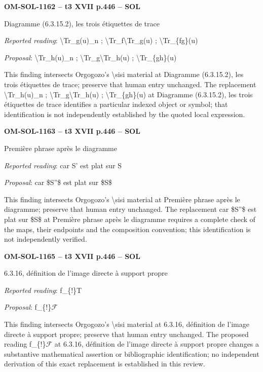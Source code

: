 \par\noindent\textbf{OM-SOL-1162 -- t3 XVII p.446 -- SOL}\par
Diagramme (6.3.15.2), les trois étiquettes de trace\par
\emph{Reported reading}: \textbackslash{}Tr\_g(u)\_n ; \textbackslash{}Tr\_f\textbackslash{}Tr\_g(u) ; \textbackslash{}Tr\_\{fg\}(u)\par
\emph{Proposal}: \textbackslash{}Tr\_h(u)\_n ; \textbackslash{}Tr\_g\textbackslash{}Tr\_h(u) ; \textbackslash{}Tr\_\{gh\}(u)\par
This finding intersects Orgogozo's \textbackslash{}sisi material at Diagramme (6.3.15.2), les trois étiquettes de trace; preserve that human entry unchanged. The replacement \textbackslash{}Tr\_h(u)\_n ; \textbackslash{}Tr\_g\textbackslash{}Tr\_h(u) ; \textbackslash{}Tr\_\{gh\}(u) at Diagramme (6.3.15.2), les trois étiquettes de trace identifies a particular indexed object or symbol; that identification is not independently established by the quoted local expression.\par
\par\noindent\textbf{OM-SOL-1163 -- t3 XVII p.446 -- SOL}\par
Première phrase après le diagramme\par
\emph{Reported reading}: car S' est plat sur S\par
\emph{Proposal}: car \$S''\$ est plat sur \$S\$\par
This finding intersects Orgogozo's \textbackslash{}sisi material at Première phrase après le diagramme; preserve that human entry unchanged. The replacement car \$S''\$ est plat sur \$S\$ at Première phrase après le diagramme requires a complete check of the maps, their endpoints and the composition convention; this identification is not independently verified.\par
\par\noindent\textbf{OM-SOL-1165 -- t3 XVII p.446 -- SOL}\par
6.3.16, définition de l'image directe à support propre\par
\emph{Reported reading}: f\_\{!\}T\par
\emph{Proposal}: f\_\{!\}\ensuremath{\mathcal{F}}\par
This finding intersects Orgogozo's \textbackslash{}sisi material at 6.3.16, définition de l'image directe à support propre; preserve that human entry unchanged. The proposed reading f\_\{!\}\ensuremath{\mathcal{F}} at 6.3.16, définition de l'image directe à support propre changes a substantive mathematical assertion or bibliographic identification; no independent derivation of this exact replacement is established in this review.\par

